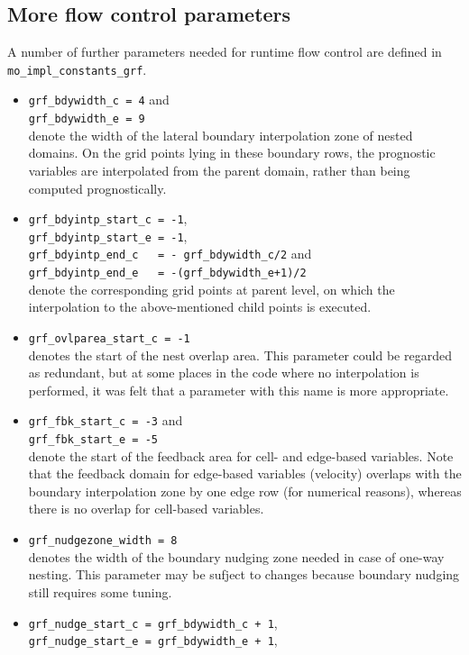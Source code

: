 \documentclass[11pt]{article}
\begin{document}
\subsection{More flow control parameters}

A number of further parameters needed for runtime flow control are defined in \verb+mo_impl_constants_grf+.
\begin{itemize}
\item
\verb+grf_bdywidth_c = 4+ and \\
\verb+grf_bdywidth_e = 9+ \\
denote the width of the lateral boundary interpolation zone
of nested domains. On the grid points lying in these boundary rows, the prognostic variables are interpolated
from the parent domain, rather than being computed prognostically.
\item
\verb+grf_bdyintp_start_c = -1+,\\
\verb+grf_bdyintp_start_e = -1+,\\
\verb+grf_bdyintp_end_c   = - grf_bdywidth_c/2+ and\\
\verb&grf_bdyintp_end_e   = -(grf_bdywidth_e+1)/2&\\
denote the corresponding grid points at parent level, on which the interpolation to the above-mentioned
child points is executed.
\item
\verb+grf_ovlparea_start_c = -1+\\
denotes the start of the nest overlap area. This parameter could be regarded as redundant, but at some
places in the code where no interpolation is performed, it was felt that a parameter with this name
is more appropriate.
\item
\verb+grf_fbk_start_c = -3+ and\\
\verb+grf_fbk_start_e = -5+\\
denote the start of the feedback area for cell- and edge-based variables. Note that the feedback domain
for edge-based variables (velocity) overlaps with the boundary interpolation zone by one edge row (for
numerical reasons), whereas there is no overlap for cell-based variables.
\item
\verb+grf_nudgezone_width = 8+\\
denotes the width of the boundary nudging zone needed in case of one-way nesting. This parameter may
be sufject to changes because boundary nudging still requires some tuning.
\item
\verb&grf_nudge_start_c = grf_bdywidth_c + 1&, \\
\verb&grf_nudge_start_e = grf_bdywidth_e + 1&, \\

\end{itemize}
\end{document}
